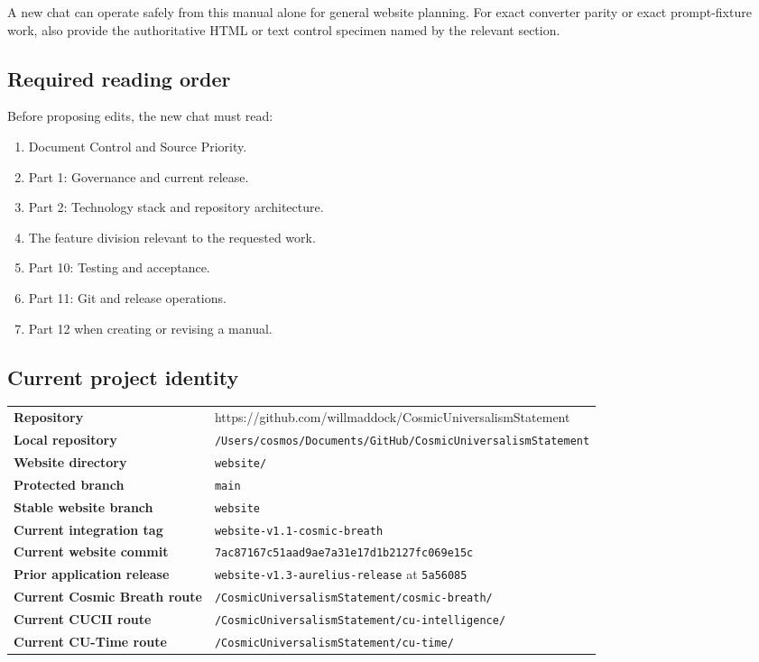 \documentclass[11pt,letterpaper]{article}
\newcommand{\RepositoryURL}{https://github.com/willmaddock/CosmicUniversalismStatement}
\newcommand{\filepath}[1]{\nolinkurl{#1}}
\newcommand{\branchname}[1]{\texttt{#1}}
\newcommand{\release}[1]{\texttt{#1}}
\begin{document}
\begin{successbox}
A new chat can operate safely from this manual alone for general website
planning. For exact converter parity or exact prompt-fixture work, also provide
the authoritative HTML or text control specimen named by the relevant section.
\end{successbox}

\subsection*{Required reading order}

Before proposing edits, the new chat must read:

\begin{enumerate}
    \item Document Control and Source Priority.
    \item Part 1: Governance and current release.
    \item Part 2: Technology stack and repository architecture.
    \item The feature division relevant to the requested work.
    \item Part 10: Testing and acceptance.
    \item Part 11: Git and release operations.
    \item Part 12 when creating or revising a manual.
\end{enumerate}

\subsection*{Current project identity}

\begin{tabularx}{\textwidth}{>{\bfseries}L{1.85in}Y}
Repository & \RepositoryURL \\
Local repository & \filepath{/Users/cosmos/Documents/GitHub/CosmicUniversalismStatement} \\
Website directory & \filepath{website/} \\
Protected branch & \branchname{main} \\
Stable website branch & \branchname{website} \\
Current integration tag & \release{website-v1.1-cosmic-breath} \\
Current website commit & \filepath{7ac87167c51aad9ae7a31e17d1b2127fc069e15c} \\
Prior application release & \release{website-v1.3-aurelius-release} at \release{5a56085} \\
Current Cosmic Breath route & \filepath{/CosmicUniversalismStatement/cosmic-breath/} \\
Current CUCII route & \filepath{/CosmicUniversalismStatement/cu-intelligence/} \\
Current CU-Time route & \filepath{/CosmicUniversalismStatement/cu-time/} \\
\end{tabularx}
\end{document}
